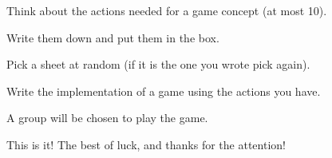 \documentclass{beamer}
\begin{document}
\begin{slide}{
\item Think about the actions needed for a game concept (at most 10).
\item Write them down and put them in the box.
\item Pick a sheet at random (if it is the one you wrote pick again).
\item Write the implementation of a game using the actions you have.
\item A group will be chosen to play the game.
}\end{slide}

\begin{frame}{This is it!}
\center
\fontsize{18pt}{7.2}\selectfont
The best of luck, and thanks for the attention!
\end{frame}
\end{document}
